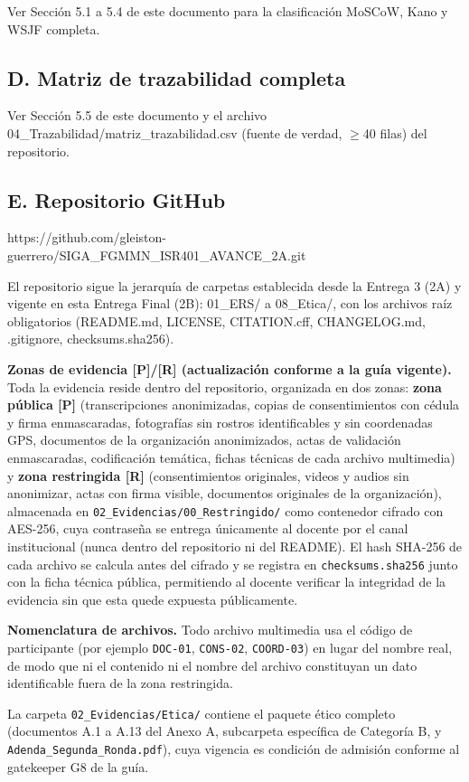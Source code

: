 Ver Sección 5.1 a 5.4 de este documento para la clasificación MoSCoW, Kano y WSJF completa.


\subsection*{D. Matriz de trazabilidad completa}


Ver Sección 5.5 de este documento y el archivo 04\_Trazabilidad/matriz\_trazabilidad.csv (fuente de verdad, $\geq$40 filas) del repositorio.


\subsection*{E. Repositorio GitHub}


https://github.com/gleiston-guerrero/SIGA\_FGMMN\_ISR401\_AVANCE\_2A.git


El repositorio sigue la jerarquía de carpetas establecida desde la Entrega 3 (2A) y vigente en esta Entrega Final (2B): 01\_ERS/ a 08\_Etica/, con los archivos raíz obligatorios (README.md, LICENSE, CITATION.cff, CHANGELOG.md, .gitignore, checksums.sha256).

\textbf{Zonas de evidencia [P]/[R] (actualización conforme a la guía vigente).} Toda la evidencia reside dentro del repositorio, organizada en dos zonas: \textbf{zona pública [P]} (transcripciones anonimizadas, copias de consentimientos con cédula y firma enmascaradas, fotografías sin rostros identificables y sin coordenadas GPS, documentos de la organización anonimizados, actas de validación enmascaradas, codificación temática, fichas técnicas de cada archivo multimedia) y \textbf{zona restringida [R]} (consentimientos originales, videos y audios sin anonimizar, actas con firma visible, documentos originales de la organización), almacenada en \nolinkurl{02_Evidencias/00_Restringido/} como contenedor cifrado con AES-256, cuya contraseña se entrega únicamente al docente por el canal institucional (nunca dentro del repositorio ni del README). El hash SHA-256 de cada archivo se calcula antes del cifrado y se registra en \texttt{checksums.sha256} junto con la ficha técnica pública, permitiendo al docente verificar la integridad de la evidencia sin que esta quede expuesta públicamente.

\textbf{Nomenclatura de archivos.} Todo archivo multimedia usa el código de participante (por ejemplo \texttt{DOC-01}, \texttt{CONS-02}, \texttt{COORD-03}) en lugar del nombre real, de modo que ni el contenido ni el nombre del archivo constituyan un dato identificable fuera de la zona restringida.

La carpeta \nolinkurl{02_Evidencias/Etica/} contiene el paquete ético completo (documentos A.1 a A.13 del Anexo A, subcarpeta específica de Categoría B, y \texttt{Adenda\_Segunda\_Ronda.pdf}), cuya vigencia es condición de admisión conforme al gatekeeper G8 de la guía.
